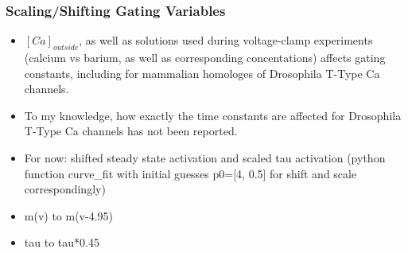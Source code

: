 \documentclass[../../workflow.tex]{subfiles}
\begin{document}
\subsubsection{Scaling/Shifting Gating Variables}

\color{red}

\begin{itemize}
    \item $[Ca]_{outside}$, as well as solutions used during voltage-clamp experiments
    (calcium vs barium, as well as corresponding concentations) affects gating constants,
    including for mammalian homologes of Drosophila T-Type Ca channels.
    \item To my knowledge, how exactly the time constants are affected for Drosophila T-Type Ca channels
    has not been reported.
    \item For now: shifted steady state activation and scaled tau activation (python function curve\_fit
    with initial guesses p0=[4, 0.5] for shift and scale correspondingly)
    \item m(v) to m(v-4.95)
    \item tau to tau*0.45
\end{itemize}

\color{black}
\end{document}
